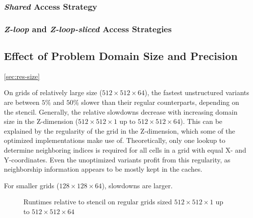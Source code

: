 \subsubsection{\emph{Shared} Access Strategy}


\subsubsection{\emph{Z-loop} and \emph{Z-loop-sliced} Access Strategies}


\subsection{Effect of Problem Domain Size and Precision} \ref{sec:res-size}

On grids of relatively large size ($512\times 512\times 64$), the fastest unstructured variants are between $5\%$ and $50\%$ slower than their regular counterparts, depending on the stencil. Generally, the relative slowdowns decrease with increasing domain size in the Z-dimension ($512\times 512\times 1$ up to $512\times 512\times 64$). This can be explained by the regularity of the grid in the Z-dimension, which some of the optimized implementations make use of. Theoretically, only one lookup to determine neighboring indices is required for all cells in a grid with equal X- and Y-coordinates. Even the unoptimized variants profit from this regularity, as neighborship information appears to be mostly kept in the caches.

For smaller grids ($128\times 128\times 64$), slowdowns are larger.

\begin{figure}
	\caption{\label{fig:results-512-sizes}Runtimes relative to stencil on regular grids sized $512\times 512\times 1$ up to $512\times 512\times 64$}
\end{figure}



